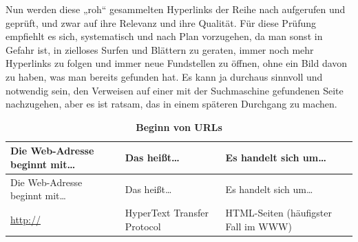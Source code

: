 \documentclass[]{book}
\theoremstyle{definition}
\theoremstyle{definition}
\theoremstyle{definition}
\theoremstyle{remark}
\begin{document}
Nun werden diese „roh`` gesammelten Hyperlinks der Reihe nach aufgerufen
und geprüft, und zwar auf ihre Relevanz und ihre Qualität. Für diese
Prüfung empfiehlt es sich, systematisch und nach Plan vorzugehen, da man
sonst in Gefahr ist, in zielloses Surfen und Blättern zu geraten, immer
noch mehr Hyperlinks zu folgen und immer neue Fundstellen zu öffnen,
ohne ein Bild davon zu haben, was man bereits gefunden hat. Es kann ja
durchaus sinnvoll und notwendig sein, den Verweisen auf einer mit der
Suchmaschine gefundenen Seite nachzugehen, aber es ist ratsam, das in
einem späteren Durchgang zu machen.

\begin{longtable}[]{@{}lll@{}}
\caption{\textbf{\label{tab:urls} Beginn von URLs}}\tabularnewline
\toprule
\begin{minipage}[b]{0.31\columnwidth}\raggedright\strut
Die Web-Adresse beginnt mit\ldots{}\strut
\end{minipage} & \begin{minipage}[b]{0.27\columnwidth}\raggedright\strut
Das heißt\ldots{}\strut
\end{minipage} & \begin{minipage}[b]{0.33\columnwidth}\raggedright\strut
Es handelt sich um\ldots{}\strut
\end{minipage}\tabularnewline
\midrule
\endfirsthead
\toprule
\begin{minipage}[b]{0.31\columnwidth}\raggedright\strut
Die Web-Adresse beginnt mit\ldots{}\strut
\end{minipage} & \begin{minipage}[b]{0.27\columnwidth}\raggedright\strut
Das heißt\ldots{}\strut
\end{minipage} & \begin{minipage}[b]{0.33\columnwidth}\raggedright\strut
Es handelt sich um\ldots{}\strut
\end{minipage}\tabularnewline
\midrule
\endhead
\begin{minipage}[t]{0.31\columnwidth}\raggedright\strut
\url{http://} \vspace{5mm}\strut
\end{minipage} & \begin{minipage}[t]{0.27\columnwidth}\raggedright\strut
HyperText Transfer Protocol \vspace{5mm}\strut
\end{minipage} & \begin{minipage}[t]{0.33\columnwidth}\raggedright\strut
HTML-Seiten (häufigster Fall im WWW) \vspace{5mm}\strut

\end{minipage}
\end{longtable}
\end{document}
